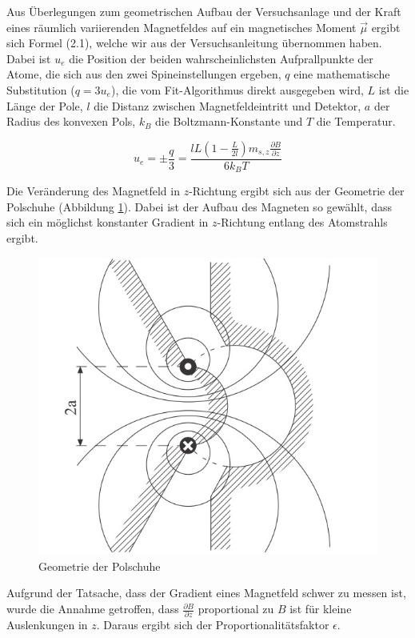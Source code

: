 \documentclass[a4paper,parskip,11pt, DIV12]{scrreprt}
\begin{document}
Aus Überlegungen zum geometrischen Aufbau der Versuchsanlage und der Kraft eines räumlich variierenden Magnetfeldes auf ein magnetisches Moment $\vec{ \mu }$ ergibt sich Formel (2.1), welche wir aus der Versuchsanleitung übernommen haben. Dabei ist $u_e$ die Position der beiden wahrscheinlichsten Aufprallpunkte der Atome, die sich aus den zwei Spineinstellungen ergeben, $q$ eine mathematische Substitution ($q=3u_e$), die vom Fit-Algorithmus direkt ausgegeben wird, $L$ ist die Länge der Pole, $l$ die Distanz zwischen Magnetfeldeintritt und Detektor, $a$ der Radius des konvexen Pols, $k_B$ die Boltzmann-Konstante und $T$ die Temperatur.


\begin{equation}
u_e=\pm \frac{q}{3}=\frac{lL(1-\frac{L}{2l})m_{s,z} \frac{\partial B}{\partial z}}{6k_BT}
\end{equation}

Die Veränderung des Magnetfeld in $z$-Richtung ergibt sich aus der Geometrie der Polschuhe (Abbildung \ref{Abb:Polschuhe}). Dabei ist der Aufbau des Magneten so gewählt, dass sich ein möglichst konstanter Gradient in $z$-Richtung entlang des Atomstrahls ergibt.

\begin{figure}[H]
\centering
\includegraphics[scale=0.7]{Polschuhe}
\caption[Polschuhe]{Geometrie der Polschuhe}
\label{Abb:Polschuhe}
\end{figure} Aufgrund der Tatsache, dass der Gradient eines Magnetfeld schwer zu messen ist, wurde die Annahme getroffen, dass $\frac{ \partial B}{ \partial z}$ proportional zu $B$ ist für kleine Auslenkungen in $z$. Daraus ergibt sich der Proportionalitätsfaktor $\epsilon$.
\end{document}
